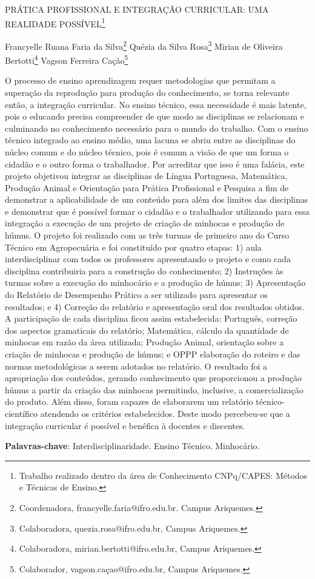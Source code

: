 \documentclass[article,12pt,onesidea,4paper,english,brazil]{abntex2}
\begin{document}
	
	
	\frenchspacing 
	
	\begin{center}
		\LARGE PRÁTICA PROFISSIONAL E INTEGRAÇÃO CURRICULAR: UMA REALIDADE
		POSSÍVEL\footnote{Trabalho realizado dentro da área de Conhecimento CNPq/CAPES: Métodos e Técnicas de Ensino.}
		
		\normalsize
	Francyelle Ruana Faria da Silva\footnote{Coordenadora, francyelle.faria@ifro.edu.br. Campus Ariquemes.} 
	Quézia da Silva Rosa\footnote{Colaboradora, quezia.rosa@ifro.edu.br, Campus Ariquemes.} 
	Mirian de Oliveira Bertotti\footnote{Colaboradora, mirian.bertotti@ifro.edu.br, Campus Ariquemes.} 
	Vagson Ferreira Cação\footnote{Colaborador, vagson.caçao@ifro.edu.br, Campus Ariquemes.} 
	\end{center}
	
	\noindent O processo de ensino aprendizagem requer metodologias que permitam a
	superação da reprodução para produção do conhecimento, se torna relevante então,
	a integração curricular. No ensino técnico, essa necessidade é mais latente, pois o
	educando precisa compreender de que modo as disciplinas se relacionam e
	culminando no conhecimento necessário para o mundo do trabalho. Com o ensino
	técnico integrado ao ensino médio, uma lacuna se abriu entre as disciplinas do
	núcleo comum e do núcleo técnico, pois é comum a visão de que um forma o
	cidadão e o outro forma o trabalhador. Por acreditar que isso é uma falácia, este
	projeto objetivou integrar as disciplinas de Língua Portuguesa, Matemática,
	Produção Animal e Orientação para Prática Profissional e Pesquisa a fim de
	demonstrar a aplicabilidade de um conteúdo para além dos limites das disciplinas e
	demonstrar que é possível formar o cidadão e o trabalhador utilizando para essa
	integração a execução de um projeto de criação de minhocas e produção de húmus.
	O projeto foi realizado com as três turmas de primeiro ano do Curso Técnico em
	Agropecuária e foi constituído por quatro etapas: 1) aula interdisciplinar com todos
	os professores apresentando o projeto e como cada disciplina contribuiria para a
	construção do conhecimento; 2) Instruções às turmas sobre a execução do
	minhocário e a produção de húmus; 3) Apresentação do Relatório de Desempenho
	Prático a ser utilizado para apresentar os resultados; e 4) Correção do relatório e
	apresentação oral dos resultados obtidos. A participação de cada disciplina ficou
	assim estabelecida: Português, correção dos aspectos gramaticais do relatório;
	Matemática, cálculo da quantidade de minhocas em razão da área utilizada;
	Produção Animal, orientação sobre a criação de minhocas e produção de húmus; e
	OPPP elaboração do roteiro e das normas metodológicas a serem adotados no
	relatório. O resultado foi a apropriação dos conteúdos, gerando conhecimento que
	proporcionou a produção húmus a partir da criação das minhocas permitindo,
	inclusive, a comercialização do produto. Além disso, foram capazes de elaborarem
	um relatório técnico-científico atendendo os critérios estabelecidos. Deste modo
	percebeu-se que a integração curricular é possível e benéfica à docentes e
	discentes.
	
	\vspace{\onelineskip}
	
	\noindent
	\textbf{Palavras-chave}: Interdisciplinaridade. Ensino Técnico. Minhocário.
	
\end{document}
